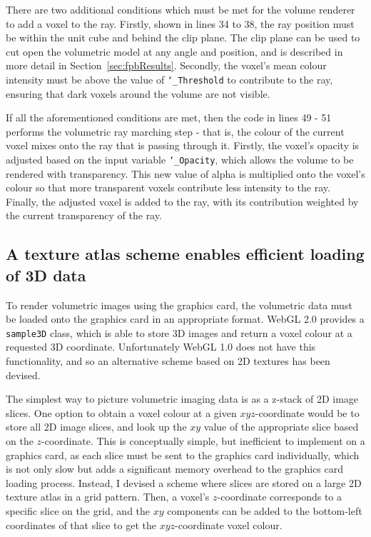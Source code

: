 There are two additional conditions which must be met for the volume renderer to add a voxel to the ray.
Firstly, shown in lines 34 to 38, the ray position must be within the unit cube and behind the clip plane.
The clip plane can be used to cut open the volumetric model at any angle and position, and is described in more detail in Section~\ref{sec:fpbResults}.
Secondly, the voxel's mean colour intensity must be above the value of \texttt{\char`_Threshold} to contribute to the ray, ensuring that dark voxels around the volume are not visible.

If all the aforementioned conditions are met, then the code in lines 49 - 51 performs the volumetric ray marching step - that is, the colour of the current voxel mixes onto the ray that is passing through it.
Firstly, the voxel's opacity is adjusted based on the input variable \texttt{\char`_Opacity}, which allows the volume to be rendered with transparency.
This new value of alpha is multiplied onto the voxel's colour so that more transparent voxels contribute less intensity to the ray.
Finally, the adjusted voxel is added to the ray, with its contribution weighted by the current transparency of the ray.

\subsection{A texture atlas scheme enables efficient loading of 3D data} \label{sec:fpbVolumeRendering}
To render volumetric images using the graphics card, the volumetric data must be loaded onto the graphics card in an appropriate format.
WebGL 2.0 provides a \texttt{sample3D} class, which is able to store 3D images and return a voxel colour at a requested 3D coordinate.
Unfortunately WebGL 1.0 does not have this functionality, and so an alternative scheme based on 2D textures has been devised.

The simplest way to picture volumetric imaging data is as a z-stack of 2D image slices.
One option to obtain a voxel colour at a given $xyz$-coordinate would be to store all 2D image slices, and look up the $xy$ value of the appropriate slice based on the $z$-coordinate.
This is conceptually simple, but inefficient to implement on a graphics card, as each slice must be sent to the graphics card individually, which is not only slow but adds a significant memory overhead to the graphics card loading process.
Instead, I devised a scheme where slices are stored on a large 2D texture atlas in a grid pattern.
Then, a voxel's $z$-coordinate corresponds to a specific slice on the grid, and the $xy$ components can be added to the bottom-left coordinates of that slice to get the $xyz$-coordinate voxel colour.

